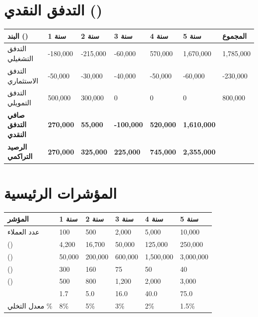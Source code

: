 \documentclass[11pt,a4paper,landscape]{article}
\begin{document}
\section{التدفق النقدي ()}
\label{sec:cashflow}

\begin{table}[H]
\centering
\footnotesize
\renewcommand{\arraystretch}{1.4}
\begin{tabularx}{\textwidth}{L{5cm} R{2.5cm} R{2.5cm} R{2.5cm} R{2.5cm} R{2.5cm} R{2.5cm}}
\toprule
\textbf{البند ()} & \textbf{سنة 1} & \textbf{سنة 2} & \textbf{سنة 3} & \textbf{سنة 4} & \textbf{سنة 5} & \textbf{المجموع} \\
\midrule
التدفق التشغيلي & -180,000 & -215,000 & -60,000 & 570,000 & 1,670,000 & 1,785,000 \\
التدفق الاستثماري & -50,000 & -30,000 & -40,000 & -50,000 & -60,000 & -230,000 \\
التدفق التمويلي & 500,000 & 300,000 & 0 & 0 & 0 & 800,000 \\
\midrule
\textbf{صافي التدفق النقدي} & \textbf{270,000} & \textbf{55,000} & \textbf{-100,000} & \textbf{520,000} & \textbf{1,610,000} & \\
\textbf{الرصيد التراكمي} & \textbf{270,000} & \textbf{325,000} & \textbf{225,000} & \textbf{745,000} & \textbf{2,355,000} & \\
\bottomrule
\end{tabularx}
\end{table}

\section{المؤشرات الرئيسية}
\label{sec:metrics}

\begin{table}[H]
\centering
\renewcommand{\arraystretch}{1.4}
\begin{tabularx}{\textwidth}{L{5cm} C{2.5cm} C{2.5cm} C{2.5cm} C{2.5cm} C{2.5cm}}
\toprule
\textbf{المؤشر} & \textbf{سنة 1} & \textbf{سنة 2} & \textbf{سنة 3} & \textbf{سنة 4} & \textbf{سنة 5} \\
\midrule
عدد العملاء & 100 & 500 & 2,000 & 5,000 & 10,000 \\
 () & 4,200 & 16,700 & 50,000 & 125,000 & 250,000 \\
 () & 50,000 & 200,000 & 600,000 & 1,500,000 & 3,000,000 \\
 () & 300 & 160 & 75 & 50 & 40 \\
 () & 500 & 800 & 1,200 & 2,000 & 3,000 \\
 & 1.7 & 5.0 & 16.0 & 40.0 & 75.0 \\
معدل التخلي \% & 8\% & 5\% & 3\% & 2\% & 1.5\% \\
\bottomrule
\end{tabularx}
\end{table}
\end{document}
